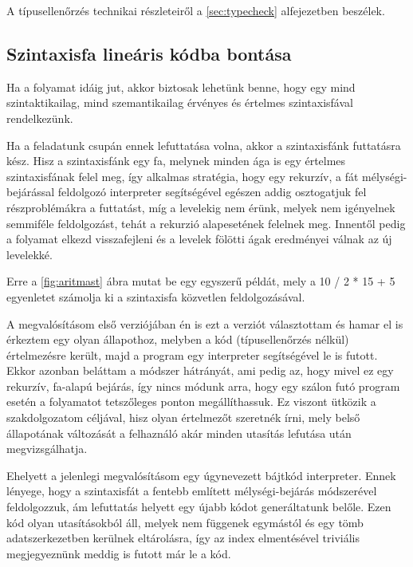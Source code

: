 A típusellenőrzés technikai részleteiről a \ref{sec:typecheck} alfejezetben beszélek.

\subsection{Szintaxisfa lineáris kódba bontása}

Ha a folyamat idáig jut, akkor biztosak lehetünk benne, hogy egy mind szintaktikailag, mind szemantikailag érvényes és értelmes szintaxisfával rendelkezünk.

Ha a feladatunk csupán ennek lefuttatása volna, akkor a szintaxisfánk futtatásra kész. Hisz a szintaxisfánk egy fa, melynek minden ága is egy értelmes szintaxisfának felel meg, így alkalmas stratégia, hogy egy rekurzív, a fát mélységi-bejárással feldolgozó interpreter segítségével egészen addig osztogatjuk fel részproblémákra a futtatást, míg a levelekig nem érünk, melyek nem igényelnek semmiféle feldolgozást, tehát a rekurzió alapesetének felelnek meg. Innentől pedig a folyamat elkezd visszafejleni és a levelek fölötti ágak eredményei válnak az új levelekké.

Erre a \ref{fig:aritmast} ábra mutat be egy egyszerű példát, mely a 10 / 2 * 15 + 5 egyenletet számolja ki a szintaxisfa közvetlen feldolgozásával.


A megvalósításom első verziójában én is ezt a verziót választottam és hamar el is érkeztem egy olyan állapothoz, melyben a kód (típusellenőrzés nélkül) értelmezésre került, majd a program egy interpreter segítségével le is futott. Ekkor azonban beláttam a módszer hátrányát, ami pedig az, hogy mivel ez egy rekurzív, fa-alapú bejárás, így nincs módunk arra, hogy egy szálon futó program esetén a folyamatot tetszőleges ponton megállíthassuk. Ez viszont ütközik a szakdolgozatom céljával, hisz olyan értelmezőt szeretnék írni, mely belső állapotának változását a felhaználó akár minden utasítás lefutása után megvizsgálhatja.

Ehelyett a jelenlegi megvalósításom egy úgynevezett bájtkód interpreter. Ennek lényege, hogy a szintaxisfát a fentebb említett mélységi-bejárás módszerével feldolgozzuk, ám lefuttatás helyett egy újabb kódot generáltatunk belőle. Ezen kód olyan utasításokból áll, melyek nem függenek egymástól és egy tömb adatszerkezetben kerülnek eltárolásra, így az index elmentésével triviális megjegyeznünk meddig is futott már le a kód.

